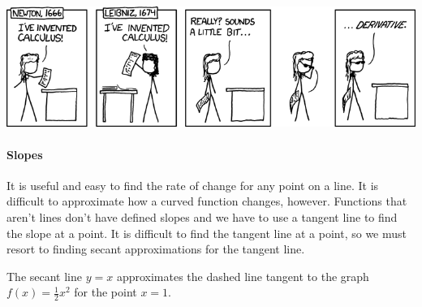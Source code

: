 \documentclass[../revisedmain.tex]{subfiles}
\begin{document}
\vspace{.125in}
\includegraphics[width=\textwidth]{images/newton.png}\\\vspace{.25in}
\paragraph{Slopes} It is useful and easy to find the rate of change for any point on a line. It is difficult to approximate how a curved function changes, however. Functions that aren't lines don't have defined slopes and we have to use a tangent line to find the slope at a point. It is difficult to find the tangent line at a point, so we must resort to finding secant approximations for the tangent line.
\begin{center}
\par The secant line $y=x$ approximates the dashed line tangent to the graph $f(x)=\frac{1}{2} x^2$ for the point $x=1$.
\end{center}
\end{document}
